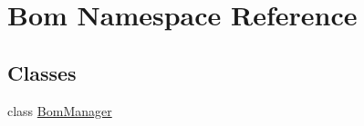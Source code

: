 \hypertarget{namespace_bom}{}\section{Bom Namespace Reference}
\label{namespace_bom}
\subsection*{Classes}
\begin{DoxyCompactItemize}
\item 
class \mbox{\hyperlink{class_bom_1_1_bom_manager}{Bom\+Manager}}
\end{DoxyCompactItemize}
